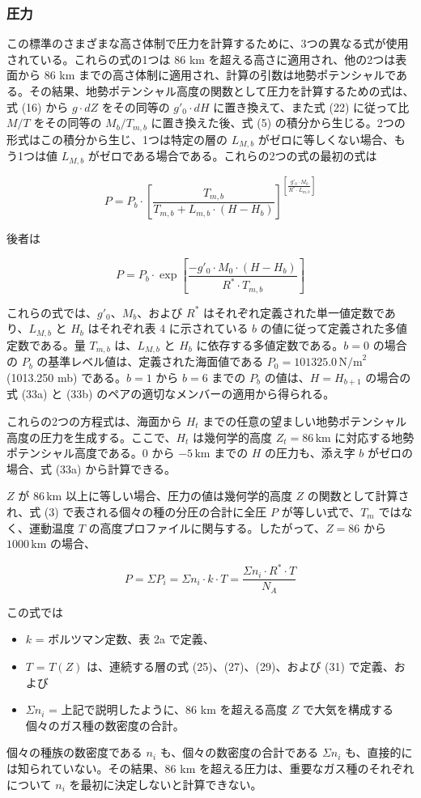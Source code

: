 \documentclass{article}
\begin{document}
\subsubsection{圧力}

この標準のさまざまな高さ体制で圧力を計算するために、3つの異なる式が使用されている。これらの式の1つは 86 km を超える高さに適用され、他の2つは表面から 86 km までの高さ体制に適用され、計算の引数は地勢ポテンシャルである。その結果、地勢ポテンシャル高度の関数として圧力を計算するための式は、式 (16) から $g \cdot dZ$ をその同等の $g'_0 \cdot dH$ に置き換えて、また式 (22) に従って比 $M/T$ をその同等の $M_b/T_{m,b}$ に置き換えた後、式 (5) の積分から生じる。2つの形式はこの積分から生じ、1つは特定の層の $L_{M,b}$ がゼロに等しくない場合、もう1つは値 $L_{M,b}$ がゼロである場合である。これらの2つの式の最初の式は

\[
P = P_b \cdot \left[\frac{T_{m,b}}{T_{m,b} + L_{m,b} \cdot (H - H_b)}\right]^{\left[ \frac{g'_0 \cdot M_b}{R^* \cdot L_{m,b}} \right]} \tag{33a}
\]

後者は

\[
P = P_b \cdot \exp \left[ \frac{-g'_0 \cdot M_0 \cdot (H - H_b)}{R^* \cdot T_{m,b}} \right] \tag{33b}
\]

これらの式では、$g'_0$、$M_b$、および $R^*$ はそれぞれ定義された単一値定数であり、$L_{M,b}$ と $H_b$ はそれぞれ表 4 に示されている $b$ の値に従って定義された多値定数である。量 $T_{m,b}$ は、$L_{M,b}$ と $H_b$ に依存する多値定数である。$b = 0$ の場合の $P_b$ の基準レベル値は、定義された海面値である $P_0 = 101325.0 \, \text{N/m}^2$ (1013.250 mb) である。$b = 1$ から $b = 6$ までの $P_b$ の値は、$H = H_{b+1}$ の場合の式 (33a) と (33b) のペアの適切なメンバーの適用から得られる。

これらの2つの方程式は、海面から $H_t$ までの任意の望ましい地勢ポテンシャル高度の圧力を生成する。ここで、$H_t$ は幾何学的高度 $Z_t = 86 \, \text{km}$ に対応する地勢ポテンシャル高度である。$0$ から $-5 \, \text{km}$ までの $H$ の圧力も、添え字 $b$ がゼロの場合、式 (33a) から計算できる。

$Z$ が $86 \, \text{km}$ 以上に等しい場合、圧力の値は幾何学的高度 $Z$ の関数として計算され、式 (3) で表される個々の種の分圧の合計に全圧 $P$ が等しい式で、$T_m$ ではなく、運動温度 $T$ の高度プロファイルに関与する。したがって、$Z = 86$ から $1000 \, \text{km}$ の場合、

\[
P = \Sigma P_i = \Sigma n_i \cdot k \cdot T = \frac{\Sigma n_i \cdot R^* \cdot T}{N_A} \tag{33c}
\]

この式では

\begin{itemize}
    \item $k$ = ボルツマン定数、表 2a で定義、
    \item $T$ = $T(Z)$ は、連続する層の式 (25)、(27)、(29)、および (31) で定義、および
    \item $\Sigma n_i$ = 上記で説明したように、86 km を超える高度 $Z$ で大気を構成する個々のガス種の数密度の合計。
\end{itemize}

個々の種族の数密度である $n_i$ も、個々の数密度の合計である $\Sigma n_i$ も、直接的には知られていない。その結果、86 km を超える圧力は、重要なガス種のそれぞれについて $n_i$ を最初に決定しないと計算できない。
\end{document}
